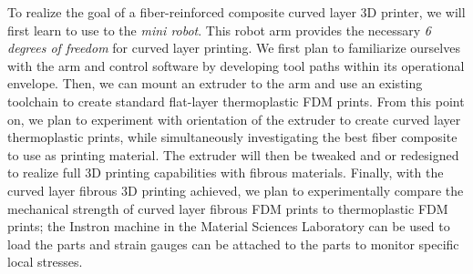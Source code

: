 \documentclass[letter,10pt,english]{article}
\begin{document}

To realize the goal of a fiber-reinforced composite curved layer 3D printer, we will first learn to use to the \emph{mini robot}. This robot arm provides the necessary \emph{6 degrees of freedom} for curved layer printing. We first plan to familiarize ourselves with the arm and control software by developing tool paths within its operational envelope. Then, we can mount an extruder to the arm and use an existing toolchain to create standard flat-layer thermoplastic FDM prints. From this point on, we plan to experiment with orientation of the extruder to create curved layer thermoplastic prints, while simultaneously investigating the best fiber composite to use as printing material. The extruder will then be tweaked and or redesigned to realize full 3D printing capabilities with fibrous materials. Finally, with the curved layer fibrous 3D printing achieved, we plan to experimentally compare the mechanical strength of curved layer fibrous FDM prints to thermoplastic FDM prints; the Instron machine in the Material Sciences Laboratory can be used to load the parts and strain gauges can be attached to the parts to monitor specific local stresses.

\end{document}
